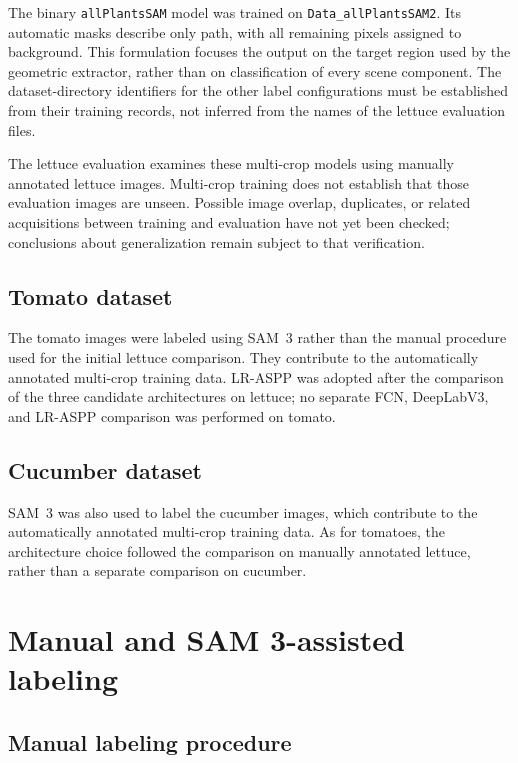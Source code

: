 The binary \texttt{allPlantsSAM} model was trained on
\texttt{Data\_\allowbreak allPlants\allowbreak SAM2}. Its automatic masks
describe only path, with all remaining pixels assigned to background.
This formulation focuses the output on the target region used by the
geometric extractor, rather than on classification of every scene component.
The dataset-directory identifiers for the other label configurations
must be established from their training records, not inferred from the
names of the lettuce evaluation files.

The lettuce evaluation examines these multi-crop models using manually
annotated lettuce images. Multi-crop training does not establish that
those evaluation images are unseen. Possible image overlap, duplicates,
or related acquisitions between training and evaluation have not yet
been checked; conclusions about generalization remain subject to that
verification.

\subsection{Tomato dataset}
\label{subsec:c3_tomato}

The tomato images were labeled using SAM~3 rather than the manual
procedure used for the initial lettuce comparison. They contribute to
the automatically annotated multi-crop training data. LR-ASPP was adopted
after the comparison of the three candidate architectures on lettuce;
no separate FCN, DeepLabV3, and LR-ASPP comparison was performed on tomato.

\subsection{Cucumber dataset}
\label{subsec:c3_cucumber}

SAM~3 was also used to label the cucumber images, which contribute to
the automatically annotated multi-crop training data. As for tomatoes,
the architecture choice followed the comparison on manually annotated
lettuce, rather than a separate comparison on cucumber.

\section{Manual and SAM 3-assisted labeling}
\label{sec:c3_annotation}

\subsection{Manual labeling procedure}
\label{subsec:c3_manual_annotation}

